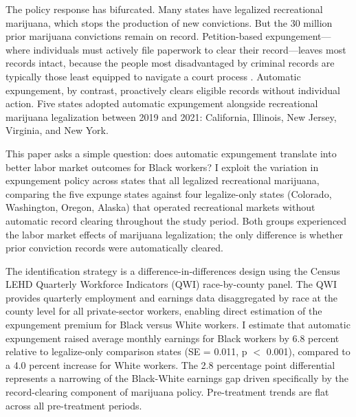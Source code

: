 \documentclass[12pt]{article}
\begin{document}
The policy response has bifurcated. Many states have legalized recreational marijuana, which stops the production of new convictions. But the 30 million prior marijuana convictions remain on record. Petition-based expungement---where individuals must actively file paperwork to clear their record---leaves most records intact, because the people most disadvantaged by criminal records are typically those least equipped to navigate a court process \citep{lageson2016digital}. Automatic expungement, by contrast, proactively clears eligible records without individual action. Five states adopted automatic expungement alongside recreational marijuana legalization between 2019 and 2021: California, Illinois, New Jersey, Virginia, and New York.

This paper asks a simple question: does automatic expungement translate into better labor market outcomes for Black workers? I exploit the variation in expungement policy across states that all legalized recreational marijuana, comparing the five expunge states against four legalize-only states (Colorado, Washington, Oregon, Alaska) that operated recreational markets without automatic record clearing throughout the study period. Both groups experienced the labor market effects of marijuana legalization; the only difference is whether prior conviction records were automatically cleared.

The identification strategy is a difference-in-differences design using the Census LEHD Quarterly Workforce Indicators (QWI) race-by-county panel. The QWI provides quarterly employment and earnings data disaggregated by race at the county level for all private-sector workers, enabling direct estimation of the expungement premium for Black versus White workers. I estimate that automatic expungement raised average monthly earnings for Black workers by 6.8 percent relative to legalize-only comparison states (SE = 0.011, p $<$ 0.001), compared to a 4.0 percent increase for White workers. The 2.8 percentage point differential represents a narrowing of the Black-White earnings gap driven specifically by the record-clearing component of marijuana policy. Pre-treatment trends are flat across all pre-treatment periods.
\end{document}
